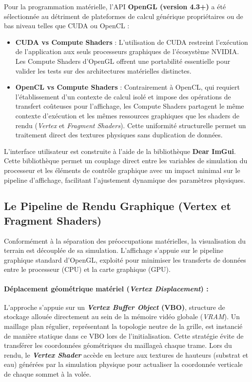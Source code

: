\documentclass[10pt,twocolumn,a4paper]{article}
\begin{document}
Pour la programmation matérielle, l'API \textbf{OpenGL (version 4.3+)} a été sélectionnée au détriment de plateformes de calcul générique propriétaires ou de bas niveau telles que CUDA ou OpenCL :
\begin{itemize}
    \item \textbf{CUDA vs Compute Shaders} : L'utilisation de CUDA restreint l'exécution de l'application aux seuls processeurs graphiques de l'écosystème NVIDIA. Les Compute Shaders d'OpenGL offrent une portabilité essentielle pour valider les tests sur des architectures matérielles distinctes.
    \item \textbf{OpenCL vs Compute Shaders} : Contrairement à OpenCL, qui requiert l'établissement d'un contexte de calcul isolé et impose des opérations de transfert coûteuses pour l'affichage, les Compute Shaders partagent le même contexte d'exécution et les mêmes ressources graphiques que les shaders de rendu (\textit{Vertex} et \textit{Fragment Shaders}). Cette uniformité structurelle permet un traitement direct des textures physiques sans duplication de données.
\end{itemize}

L'interface utilisateur est construite à l'aide de la bibliothèque \textbf{Dear ImGui}. Cette bibliothèque permet un couplage direct entre les variables de simulation du processeur et les éléments de contrôle graphique avec un impact minimal sur le pipeline d'affichage, facilitant l'ajustement dynamique des paramètres physiques.

\subsection{Le Pipeline de Rendu Graphique (Vertex et Fragment Shaders)}\label{subsec:pipeline_rendu}
Conformément à la séparation des préoccupations matérielles, la visualisation du terrain est découplée de sa simulation. L'affichage s'appuie sur le pipeline graphique standard d'OpenGL, exploité pour minimiser les transferts de données entre le processeur (CPU) et la carte graphique (GPU).

\paragraph{Déplacement géométrique matériel (\textit{Vertex Displacement}) :}
L'approche s'appuie sur un \textbf{\textit{Vertex Buffer Object} (VBO)}, structure de stockage allouée directement au sein de la mémoire vidéo globale (\textit{VRAM}). Un maillage plan régulier, représentant la topologie neutre de la grille, est instancié de manière statique dans ce VBO lors de l'initialisation. Cette stratégie évite de transférer les coordonnées géométriques du maillageà chaque trame. Lors du rendu, le \textbf{\textit{Vertex Shader}} accède en lecture aux textures de hauteurs (substrat et eau) générées par la simulation physique pour actualiser la coordonnée verticale de chaque sommet à la volée.
\end{document}
